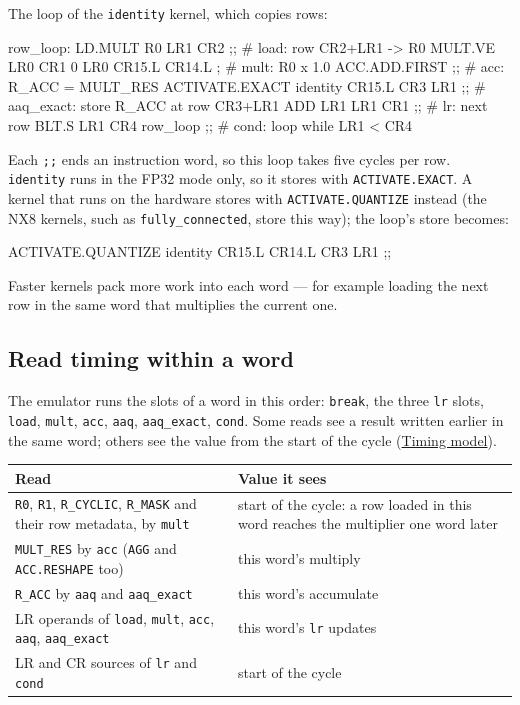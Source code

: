 \documentclass[11pt,a4paper]{article}
\newcommand{\doc}[2]{\href{https://rechefe.github.io/ipu-emulator/dev/#1/}{\textcolor{accent}{#2}}}
\begin{document}
The loop of the \texttt{identity} kernel, which copies rows:

\begin{pycode}
row_loop:
    LD.MULT R0 LR1 CR2 ;;                       # load:      row CR2+LR1 -> R0
    MULT.VE LR0 CR1 0 LR0 CR15.L CR14.L ;       # mult:      R0 x 1.0
    ACC.ADD.FIRST ;;                            # acc:       R_ACC = MULT_RES
    ACTIVATE.EXACT identity CR15.L CR3 LR1 ;;   # aaq_exact: store R_ACC at row CR3+LR1
    ADD LR1 LR1 CR1 ;;                          # lr:        next row
    BLT.S LR1 CR4 row_loop ;;                   # cond:      loop while LR1 < CR4
\end{pycode}

Each \texttt{;;} ends an instruction word, so this loop takes five cycles per
row. \texttt{identity} runs in the FP32 mode only, so it stores with
\texttt{ACTIVATE.EXACT}. A kernel that runs on the hardware stores with
\texttt{ACTIVATE.QUANTIZE} instead (the NX8 kernels, such as
\texttt{fully\_connected}, store this way); the loop's store becomes:

\begin{pycode}
    ACTIVATE.QUANTIZE identity CR15.L CR14.L CR3 LR1 ;;
\end{pycode}

Faster kernels pack more work into each word --- for example loading the
next row in the same word that multiplies the current one.

\subsection{Read timing within a word}

The emulator runs the slots of a word in this order: \texttt{break}, the three
\texttt{lr} slots, \texttt{load}, \texttt{mult}, \texttt{acc}, \texttt{aaq},
\texttt{aaq\_exact}, \texttt{cond}. Some reads see a result written earlier in
the same word; others see the value from the start of the cycle
(\doc{explanation/timing-model}{Timing model}).

\begin{center}
\small
\begin{tabularx}{\linewidth}{lX}
\toprule
Read & Value it sees \\
\midrule
\texttt{R0}, \texttt{R1}, \texttt{R\_CYCLIC}, \texttt{R\_MASK} and their row
metadata, by \texttt{mult} & start of the cycle: a row loaded in this word
reaches the multiplier one word later \\
\texttt{MULT\_RES} by \texttt{acc} (\texttt{AGG} and \texttt{ACC.RESHAPE}
too) & this word's multiply \\
\texttt{R\_ACC} by \texttt{aaq} and \texttt{aaq\_exact} & this word's accumulate \\
LR operands of \texttt{load}, \texttt{mult}, \texttt{acc}, \texttt{aaq},
\texttt{aaq\_exact} & this word's \texttt{lr} updates \\
LR and CR sources of \texttt{lr} and \texttt{cond} & start of the cycle \\
\bottomrule
\end{tabularx}
\end{center}
\end{document}
